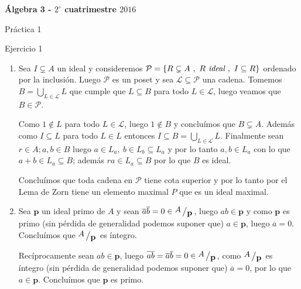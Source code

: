 \documentclass[11pt]{article}
\renewcommand{\P}{\mathcal{P}}
\newcommand\pp{\mathbf{p}}
\newcommand{\sett}[1]{\left\lbrace#1\right\rbrace}
\newcommand{\Bigcup}[2]{\bigcup\limits_{#1}{#2}}
\newcommand{\quotient}[2]{{\raisebox{.2em}{$#1$}\left/\raisebox{-.2em}{$#2$}\right.}}
\newenvironment{proof}[1][Demostraci\'on]{\begin{trivlist}
		\item[\hskip \labelsep {\bfseries #1}]}{\end{trivlist}}
\begin{document}
	
	\pagestyle{empty}
	\pagestyle{fancy}
	\fancyfoot[CO]{\slshape \thepage}
	\renewcommand{\headrulewidth}{0pt}
	
	
	
	\centerline{\bf \'Algebra 3 - $2^{\circ}$ cuatrimestre $2016$}
	\centerline{\sc Pr\'actica 1}
	
	\bigskip
	
\begin{enumerate}
	
	\item Ejercicio 1
	
	\label{Ejercicio 1}
	
	\begin{proof}
		
		\begin{enumerate}
			
			\item Sea $I \subsetneq A$ un ideal y consideremos $\mathcal{P} = \sett{R \subsetneq A \ , \ R \emph{ ideal } , \ I \subseteq R}$ ordenado por la inclusi\'on. Luego $\P$ es un poset y sea $\mathcal{L} \subseteq \P$ una cadena. Tomemos $B = \Bigcup{L \in \mathcal{L}}{L}$ que cumple que $L \subseteq B$ para todo $L \in \mathcal{L}$, luego veamos que $B \in \P$. 
				
			Como $1 \not \in L$ para todo $L \in \mathcal{L}$, luego $1 \not \in B$ y conclu\'imos que $B \subsetneq A$. Adem\'as como $I \subseteq L$ para todo $L \in L$ entonces $I \subseteq B = \Bigcup{L \in \mathcal{L}}{L}$. Finalmente sean $r \in A; a,b \in B$ luego $a \in L_a , \ b \in L_b \subseteq L_a$ y por lo tanto $a,b \in L_a$ con lo que $a +b \in L_a \subseteq B$; adem\'as $ra \in L_a \subseteq B$ por lo que $B$ es ideal.
				
			Conclu\'imos que toda cadena en $\P$ tiene cota superior y por lo tanto por el Lema de Zorn tiene un elemento maximal $P$ que es un ideal maximal.
			
			\item Sea $\pp$ un ideal primo de $A$ y sean $\overline{a}\overline{b} = 0 \in \quotient{A}{\pp}$, luego $ab \in \pp$ y como $\pp$ es primo (sin p\'erdida de generalidad podemos suponer que) $a \in \pp$, luego $\overline{a} = 0$. Conclu\'imos que $\quotient{A}{\pp}$ es \'integro.
			
			Rec\'iprocamente sean $ab \in \pp$, luego $\overline{ab} = \overline{a}\overline{b} = 0 \in \quotient{A}{\pp}$, como $\quotient{A}{\pp}$ es \'integro (sin p\'erdida de generalidad podemos suponer que) $\overline{a} = 0$, por lo que $a \in \pp$. Conclu\'imos que $\pp$ es primo.
			

\end{enumerate}
\end{proof}
\end{enumerate}
\end{document}
